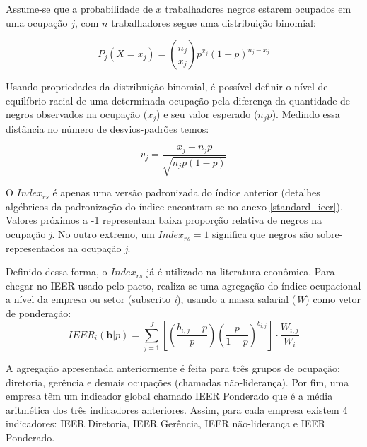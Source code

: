 \documentclass[12pt]{article}
\begin{document}
\par Assume-se que a probabilidade de $x$ trabalhadores negros estarem ocupados em uma ocupação $j$, com $n$ trabalhadores segue uma distribuição binomial:

\begin{equation}
P_{j}(X=x_{j})=\binom{n_{j}}{x_{j}}p^{x_{j}}(1-p)^{n_{j}-x_{j}}
\end{equation}

\par Usando propriedades da distribuição binomial, é possível definir o nível de equilíbrio racial de uma determinada ocupação pela diferença da quantidade de negros observados na ocupação ($x_{j}$) e seu valor esperado ($n_{j}p$). Medindo essa distância no número de desvios-padrões temos:

\begin{equation}
\label{eqv}
v_{j} = \frac{x_{j} - n_{j}p}{\sqrt{n_{j}p(1-p)}}
\end{equation}

\par  O $Index_{rs}$ é apenas uma versão padronizada do índice anterior (detalhes algébricos da padronização do índice encontram-se no anexo \ref{standard_ieer}). Valores próximos a -1 representam baixa proporção relativa de negros na ocupação \textit{j}. No outro extremo, um $Index_{rs}=1$ significa que negros são sobre-representados na ocupação \textit{j}.

\par Definido dessa forma, o $Index_{rs}$ já é utilizado na literatura econômica.\autocite{ransom2001one, rodriguescinzas} Para chegar no IEER usado pelo pacto, realiza-se uma agregação do índice ocupacional a nível da empresa ou setor (subscrito \textit{i}), usando a massa salarial (\textit{W}) como vetor de ponderação:
\begin{equation}
    IEER_{i}(\textbf{b}|p) = \sum_{j=1}^{J}\left[\left(\frac{b_{i,j}-p}{p}\right)\left(\frac{p}{1-p}\right)^{b_{i,j}}\right] \cdot \frac{W_{i,j}}{W_{i}}
    \label{eq_2}
\end{equation}

\par A agregação apresentada anteriormente é feita para três grupos de ocupação: diretoria, gerência e demais ocupações (chamadas não-liderança). Por fim, uma empresa têm um indicador global chamado IEER Ponderado que é a média aritmética dos três indicadores anteriores. Assim, para cada empresa existem 4 indicadores: IEER Diretoria, IEER Gerência, IEER não-liderança e IEER Ponderado.
\end{document}
